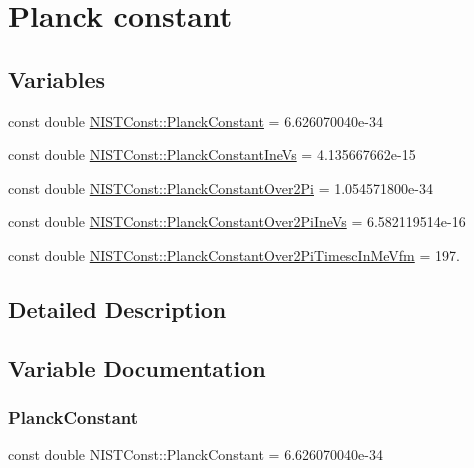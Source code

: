 \hypertarget{group___n_i_s_t_const-_planck_constant}{}\section{Planck constant}
\label{group___n_i_s_t_const-_planck_constant}
\subsection*{Variables}
\begin{DoxyCompactItemize}
\item 
const double \mbox{\hyperlink{group___n_i_s_t_const-_planck_constant_ga6caa482b17de2f08f423eff1a521b0d7}{N\+I\+S\+T\+Const\+::\+Planck\+Constant}} = 6.\+626070040e-\/34
\item 
const double \mbox{\hyperlink{group___n_i_s_t_const-_planck_constant_ga4587d736f45c35788453a9509eaee7f2}{N\+I\+S\+T\+Const\+::\+Planck\+Constant\+Ine\+Vs}} = 4.\+135667662e-\/15
\item 
const double \mbox{\hyperlink{group___n_i_s_t_const-_planck_constant_ga9b3484c3c80e4a97206c7945b0db539b}{N\+I\+S\+T\+Const\+::\+Planck\+Constant\+Over2\+Pi}} = 1.\+054571800e-\/34
\item 
const double \mbox{\hyperlink{group___n_i_s_t_const-_planck_constant_ga1d45cff7c25d4ebb0639311d5c3ea20d}{N\+I\+S\+T\+Const\+::\+Planck\+Constant\+Over2\+Pi\+Ine\+Vs}} = 6.\+582119514e-\/16
\item 
const double \mbox{\hyperlink{group___n_i_s_t_const-_planck_constant_ga76ea84456bc32be18fa15034da108214}{N\+I\+S\+T\+Const\+::\+Planck\+Constant\+Over2\+Pi\+Timesc\+In\+Me\+Vfm}} = 197.
\end{DoxyCompactItemize}


\subsection{Detailed Description}


\subsection{Variable Documentation}
\mbox{\label{group___n_i_s_t_const-_planck_constant_ga6caa482b17de2f08f423eff1a521b0d7}} 
\subsubsection{\texorpdfstring{Planck\+Constant}{PlanckConstant}}
{\footnotesize\ttfamily const double N\+I\+S\+T\+Const\+::\+Planck\+Constant = 6.\+626070040e-\/34}

